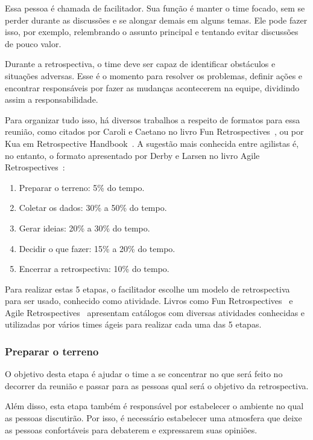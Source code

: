 Essa pessoa é chamada de facilitador. Sua função é manter o time focado, sem se perder durante as discussões e se alongar demais em alguns temas. Ele pode fazer isso, por exemplo, relembrando o assunto principal e tentando evitar discussões de pouco valor.

Durante a retrospectiva, o time deve ser capaz de identificar obstáculos e situações adversas. Esse é o momento para resolver os problemas, definir ações e encontrar responsáveis por fazer as mudanças acontecerem na equipe, dividindo assim a responsabilidade.

Para organizar tudo isso, há diversos trabalhos a respeito de formatos para essa reunião, como citados por Caroli e Caetano no livro Fun Retrospectives~\cite{funRetrospectives}, ou por Kua em Retrospective Handbook~\cite{handRetrospectives}. A sugestão mais conhecida entre agilistas é, no entanto, o formato apresentado por Derby e Larsen no livro Agile Retrospectives~\cite{retrospectives}: 

\begin{enumerate}
	\item Preparar o terreno: 5\% do tempo.
	\item Coletar os dados: 30\% a 50\% do tempo.
	\item Gerar ideias: 20\% a 30\% do tempo.
	\item Decidir o que fazer: 15\% a 20\% do tempo.
	\item Encerrar a retrospectiva: 10\% do tempo.
\end{enumerate}

Para realizar estas 5 etapas, o facilitador escolhe um modelo de retrospectiva para ser usado, conhecido como atividade. Livros como Fun Retrospectives~\cite{funRetrospectives} e Agile Retrospectives~\cite{retrospectives} apresentam catálogos com diversas atividades conhecidas e utilizadas por vários times ágeis para realizar cada uma das 5 etapas.

\subsubsection*{Preparar o terreno}

O objetivo desta etapa é ajudar o time a se concentrar no que será feito no decorrer da reunião e passar para as pessoas qual será o objetivo da retrospectiva.

Além disso, esta etapa também é responsável por estabelecer o ambiente no qual as pessoas discutirão. Por isso, é necessário estabelecer uma atmosfera que deixe as pessoas confortáveis para debaterem e expressarem suas opiniões.

